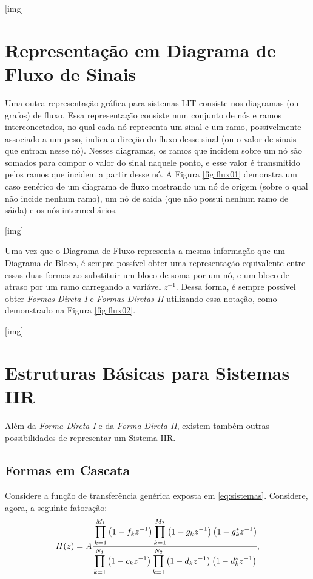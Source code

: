 \documentclass[11pt]{article}
\begin{document}
[img]

\section{Representação em Diagrama de Fluxo de Sinais}

Uma outra representação gráfica para sistemas LIT consiste nos diagramas (ou grafos) de fluxo. Essa representação consiste num conjunto de nós e ramos interconectados, no qual cada nó representa um sinal e um ramo, possivelmente associado a um peso, indica a direção do fluxo desse sinal (ou o valor de sinais que entram nesse nó). Nesses diagramas, os ramos que incidem sobre um nó são somados para compor o valor do sinal naquele ponto, e esse valor é transmitido pelos ramos que incidem a partir desse nó. A Figura \ref{fig:flux01} demonstra um caso genérico de um diagrama de fluxo mostrando um nó de origem (sobre o qual não incide nenhum ramo), um nó de saída (que não possui nenhum ramo de sáida) e os nós intermediários.

[img]

Uma vez que o Diagrama de Fluxo representa a mesma informação que um Diagrama de Bloco, é sempre possível obter uma representação equivalente entre essas duas formas ao substituir um bloco de soma por um nó, e um bloco de atraso por um ramo carregando a variável $z^{-1}$. Dessa forma, é sempre possível obter \textit{Formas Direta I} e \textit{Formas Diretas II} utilizando essa notação, como demonstrado na Figura \ref{fig:flux02}.

[img]

\section{Estruturas Básicas para Sistemas IIR}

Além da \textit{Forma Direta I} e da \textit{Forma Direta II}, existem também outras possibilidades de representar um Sistema IIR. 

\subsection{Formas em Cascata}

Considere a função de transferência genérica exposta em \eqref{eq:sistemas}. Considere, agora, a seguinte fatoração:
\begin{equation}
	H(z) = A \cfrac{\displaystyle\prod_{k=1}^{M_1}\left( 1 - f_k z^{-1} \right) \displaystyle\prod_{k=1}^{M_2}\left( 1 - g_k z^{-1} \right) \left( 1 - g^*_k z^{-1} \right)}{\displaystyle\prod_{k=1}^{N_1}\left( 1 - c_k z^{-1} \right) \displaystyle\prod_{k=1}^{N_2}\left( 1 - d_k z^{-1} \right) \left( 1 - d^*_k z^{-1} \right)},
\end{equation}
\end{document}
